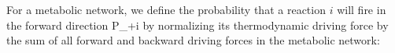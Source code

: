 For a metabolic network, we define the probability that a reaction $i$ will fire in the forward direction {\mathcal P_{+i}} by normalizing its thermodynamic driving force by the sum of all forward and backward driving forces in the metabolic network: